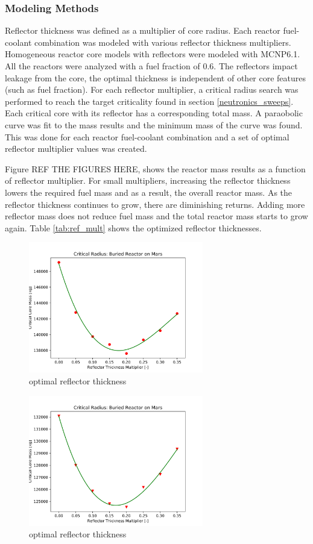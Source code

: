 \subsubsection{Modeling Methods}
Reflector thickness was defined as a multiplier of core radius. Each reactor
fuel-coolant combination was modeled with various reflector thickness
multipliers. Homogeneous reactor core models with reflectors were modeled with
MCNP6.1. All the reactors were analyzed with a fuel fraction of 0.6. The
reflectors impact leakage from the core, the optimal thickness is independent of
other core features (such as fuel fraction). For each reflector multiplier, a critical radius search was performed
to reach the target criticality found in section \ref{neutronics_sweeps}. Each
critical core with its reflector has a corresponding total mass. A paraobolic
curve was fit to the mass results and the minimum mass of the curve was found.
This was done for each reactor fuel-coolant combination and a set of optimal
reflector multiplier values was created.

Figure REF THE FIGURES HERE, shows the reactor mass results as a function of
reflector multiplier. For small multipliers, increasing the reflector thickness
lowers the required fuel mass and as a result, the overall reactor mass. As the
reflector thickness continues to grow, there are diminishing returns. Adding
more reflector mass does not reduce fuel mass and the total reactor mass starts
to grow again. Table \ref{tab:ref_mult} shows the optimized reflector
thicknesses.

\begin{figure}[h]
    \centering
    \includegraphics[width=3in]{../images/opt_refl_CO2_UO2.png}
\caption{\codiox \uox optimal reflector thickness}
\label{fig:uo2_co2_refl}
\end{figure}

\begin{figure}[h]
    \centering
    \includegraphics[width=3in]{../images/opt_refl_H2O_UO2.png}
\caption{\water \uox optimal reflector thickness}
\label{fig:uo2_h2o_refl}
\end{figure}


